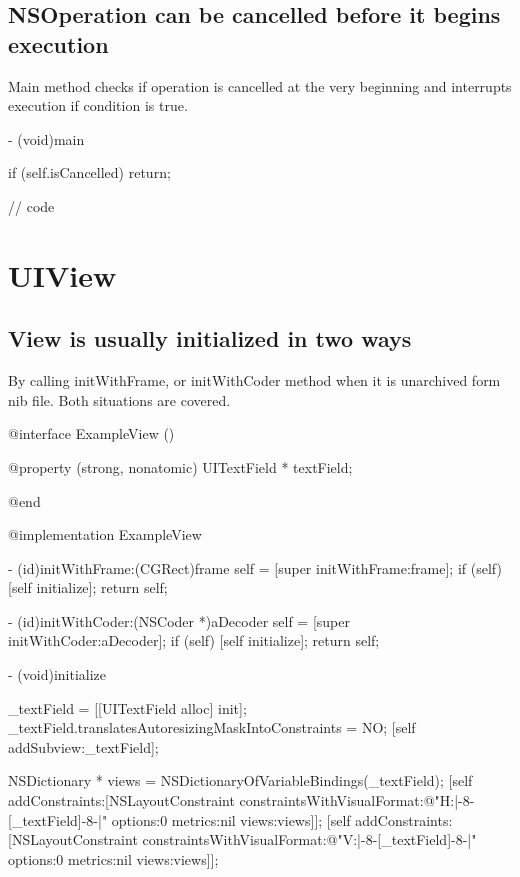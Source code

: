 \documentclass[10pt]{extarticle}
\newenvironment{codelisting}
{\footnotesize\mdframed[middlelinewidth=0.5pt, middlelinecolor=BaliHaiColor, skipabove=15pt]\verbatim}
{\endverbatim\endmdframed\vspace{12pt}\normalsize}
\begin{document}
\subsection{NSOperation can be cancelled before it begins execution}

Main method checks if operation is cancelled at the very beginning and interrupts execution if condition is true.

\begin{codelisting}
- (void)main
{
    if (self.isCancelled) return;
    
    // code
}
\end{codelisting}


\section{UIView}

\subsection{View is usually initialized in two ways}

By calling initWithFrame, or initWithCoder method when it is unarchived form nib file. Both situations are covered.

\begin{codelisting}
@interface ExampleView ()

@property (strong, nonatomic) UITextField * textField;

@end

@implementation ExampleView

- (id)initWithFrame:(CGRect)frame
{
    self = [super initWithFrame:frame];
    if (self) {
        [self initialize];
    }
    return self;
}

- (id)initWithCoder:(NSCoder *)aDecoder
{
    self = [super initWithCoder:aDecoder];
    if (self) {
        [self initialize];
    }
    return self;
}

- (void)initialize
{
    _textField = [[UITextField alloc] init];
    _textField.translatesAutoresizingMaskIntoConstraints = NO;
    [self addSubview:_textField];
    
    NSDictionary * views = NSDictionaryOfVariableBindings(_textField);
    [self addConstraints:[NSLayoutConstraint constraintsWithVisualFormat:@"H:|-8-[_textField]-8-|"
                                                                 options:0
                                                                 metrics:nil
                                                                   views:views]];
    [self addConstraints:[NSLayoutConstraint constraintsWithVisualFormat:@"V:|-8-[_textField]-8-|"
                                                                 options:0
                                                                 metrics:nil
                                                                   views:views]];
}
\end{codelisting}
\end{document}
